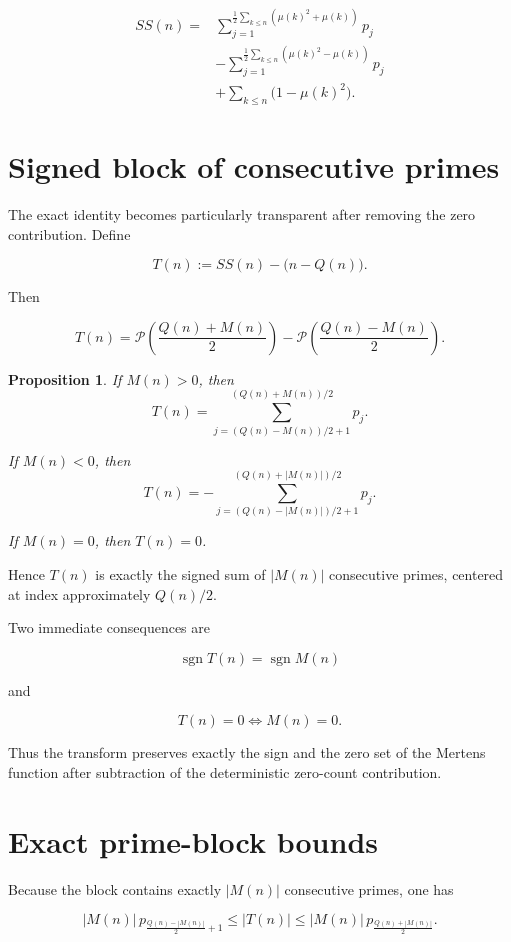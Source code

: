 \documentclass[11pt]{amsart}
\newtheorem{proposition}[definition]{Proposition}
\newcommand{\mob}{\mu}
\newcommand{\Mert}{M}
\newcommand{\Sq}{Q}
\newcommand{\PS}{\mathcal P}
\begin{document}
\[
\boxed{
\begin{aligned}
SS(n)
={}&
\sum_{j=1}^{\frac12\sum_{k\le n}(\mob(k)^2+\mob(k))}p_j
\\
&-
\sum_{j=1}^{\frac12\sum_{k\le n}(\mob(k)^2-\mob(k))}p_j
\\
&+
\sum_{k\le n}\bigl(1-\mob(k)^2\bigr).
\end{aligned}
}
\]

\section{Signed block of consecutive primes}

The exact identity becomes particularly transparent after removing the zero contribution. Define

\[
T(n):=SS(n)-\bigl(n-\Sq(n)\bigr).
\]

Then

\[
T(n)
=
\PS\!\left(\frac{\Sq(n)+\Mert(n)}2\right)
-
\PS\!\left(\frac{\Sq(n)-\Mert(n)}2\right).
\]

\begin{proposition}
If $\Mert(n)>0$, then
\[
\boxed{
T(n)
=
\sum_{j=(\Sq(n)-\Mert(n))/2+1}^{(\Sq(n)+\Mert(n))/2}p_j.
}
\]

If $\Mert(n)<0$, then
\[
\boxed{
T(n)
=
-
\sum_{j=(\Sq(n)-|\Mert(n)|)/2+1}^{(\Sq(n)+|\Mert(n)|)/2}p_j.
}
\]

If $\Mert(n)=0$, then $T(n)=0$.
\end{proposition}

Hence $T(n)$ is exactly the signed sum of $|\Mert(n)|$ consecutive primes, centered at index approximately $\Sq(n)/2$.

Two immediate consequences are

\[
\boxed{
\operatorname{sgn}T(n)=\operatorname{sgn}\Mert(n)
}
\]

and

\[
\boxed{
T(n)=0\iff \Mert(n)=0.
}
\]

Thus the transform preserves exactly the sign and the zero set of the Mertens function after subtraction of the deterministic zero-count contribution.

\section{Exact prime-block bounds}

Because the block contains exactly $|\Mert(n)|$ consecutive primes, one has

\[
\boxed{
|\Mert(n)|\,
p_{\frac{\Sq(n)-|\Mert(n)|}{2}+1}
\le
|T(n)|
\le
|\Mert(n)|\,
p_{\frac{\Sq(n)+|\Mert(n)|}{2}}.
}
\]
\end{document}
